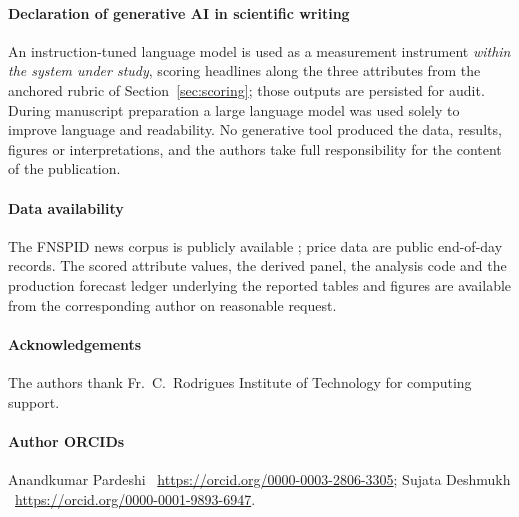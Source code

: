 \documentclass[preprint,12pt,authoryear]{elsarticle}
\theoremstyle{plain}
\theoremstyle{remark}
\newif\ifblind
\begin{document}
\paragraph{Declaration of generative AI in scientific writing}
An instruction-tuned language model is used as a measurement instrument
\emph{within the system under study}, scoring headlines along the three
attributes from the anchored rubric of Section~\ref{sec:scoring}; those outputs
are persisted for audit. During manuscript preparation a large language model was
used solely to improve language and readability. No generative tool produced the
data, results, figures or interpretations, and the authors take full
responsibility for the content of the publication.

\paragraph{Data availability} The FNSPID news corpus is publicly available
\citep{dong2024}; price data are public end-of-day records. The scored attribute
values, the derived panel, the analysis code and the production forecast ledger
underlying the reported tables and figures are available from the corresponding
author on reasonable request.

\ifblind
\else
\paragraph{Acknowledgements} The authors thank Fr.~C.~Rodrigues Institute of
Technology for computing support.

\paragraph{Author ORCIDs}
Anandkumar Pardeshi \textemdash\ \url{https://orcid.org/0000-0003-2806-3305};
Sujata Deshmukh \textemdash\ \url{https://orcid.org/0000-0001-9893-6947}.
\fi



\end{document}
